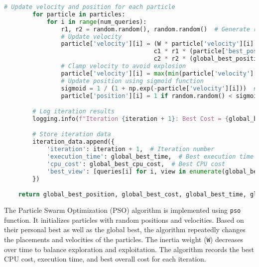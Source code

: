 \begin{lstlisting}[language=Python]
        # Update velocity and position for each particle
        for particle in particles:
            for i in range(num_queries):
                r1, r2 = random.random(), random.random()  # Generate random numbers
                # Update velocity
                particle['velocity'][i] = (W * particle['velocity'][i] +
                                          c1 * r1 * (particle['best_position'][i] - particle['position'][i]) +
                                          c2 * r2 * (global_best_position[i] - particle['position'][i]))
                # Clamp velocity to avoid explosion
                particle['velocity'][i] = max(min(particle['velocity'][i], v_max), -v_max)
                # Update position using sigmoid function
                sigmoid = 1 / (1 + np.exp(-particle['velocity'][i]))  # Sigmoid function
                particle['position'][i] = 1 if random.random() < sigmoid else 0  # Update position

        # Log iteration results
        logging.info(f"Iteration {iteration + 1}: Best Cost = {global_best_cost:.4f}, Execution Time = {global_best_time:.4f}, CPU Cost = {global_best_cpu_cost:.4f}")

        # Store iteration data
        iteration_data.append({
            'iteration': iteration + 1,  # Iteration number
            'execution_time': global_best_time,  # Best execution time
            'cpu_cost': global_best_cpu_cost,  # Best CPU cost
            'best_view': [queries[i] for i, view in enumerate(global_best_position) if view == 1]  # Best view(s)
        })

    return global_best_position, global_best_cost, global_best_time, global_best_cpu_cost, iteration_data
\end{lstlisting}\vspace{.4cm}

The Particle Swarm Optimization (PSO) algorithm is implemented using \texttt{pso} function. It initializes particles with random positions and velocities. Based on their personal best as well as the global best, the algorithm repeatedly changes the placements and velocities of the particles. The inertia weight (\texttt{W}) decreases over time to balance exploration and exploitation. The algorithm records the best CPU cost, execution time, and best overall cost for each iteration.

